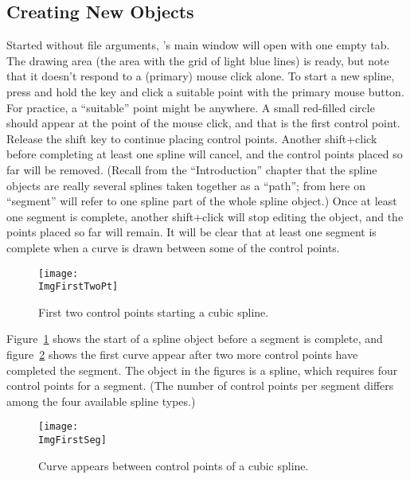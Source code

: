 		\subsection{Creating New Objects}%
		\label{ssec:creating_newobj}
		Started without file arguments, \IXpkg{}'s
		main window will open with one empty tab.
		The drawing area (the area with the grid
		of light blue lines) is ready, but note that it
		doesn't respond to a (primary) mouse click alone. To start
		a new spline, press and hold the 
		key and click a suitable point with the primary
		mouse button. For practice, a ``suitable'' point
		might be anywhere. A small red-filled circle should
		appear at the point of the mouse click, and that is
		the first control point. Release the shift key to
		continue placing control points. Another shift+click
		before completing at least one spline 
		will cancel, and the control points placed so far will be
		removed. (Recall from the ``Introduction'' chapter
		that the spline objects are really several splines
		taken together as a ``path''; from here on ``segment''
		will refer to one spline part of the whole spline object.)
		Once at least one segment is complete, another
		shift+click will stop editing the object, and the points
		placed so far will remain.
		It will be clear that at least one segment is complete
		when a curve is drawn between some of the control points.
		
		\begin{figure}[htbp]
		\centering
		\texttt{[image: \\ImgFirstTwoPt]}
		\caption{First two control points starting a cubic spline.}
		\label{fig:first_two_points}
		\end{figure}
		
		Figure~\ref{fig:first_two_points} shows the start of a
		spline object before a segment is complete, and
		figure~\ref{fig:first_curve_between} shows the first
		curve appear after two more control points have completed
		the segment. The object in the figures is a 
		spline, which requires four control points for a segment.
		(The number of control points per segment differs among the
		four available spline types.) 
		
		\begin{figure}[htbp]
		\centering
		\texttt{[image: \\ImgFirstSeg]}
		\caption{Curve appears between control points of a cubic spline.}
		\label{fig:first_curve_between}
		\end{figure}

